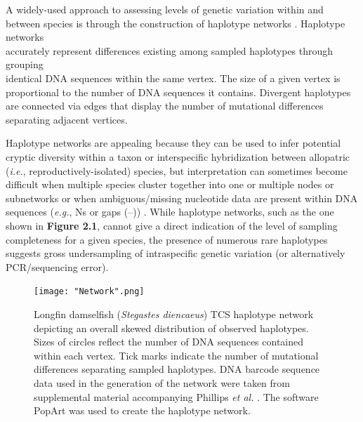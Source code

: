A widely-used approach to assessing levels of genetic variation within and between species is through the construction of haplotype networks \cite{templeton1992cladistic}. Haplotype networks \\ accurately represent differences existing among sampled haplotypes through grouping \\ identical DNA sequences within the same vertex. The size of a given vertex is proportional to the number of DNA sequences it contains.  Divergent haplotypes are connected via edges that display the number of mutational differences separating adjacent vertices.

 

Haplotype networks are appealing because they can be used to infer potential cryptic diversity within a taxon or interspecific hybridization between allopatric \\ (\textit{i.e.}, reproductively-isolated) species, but interpretation can sometimes become difficult when multiple species cluster together into one or multiple nodes or subnetworks \cite{hanner2011dna, hart2007things, wong2009identifying} or when ambiguous/missing nucleotide data are present within DNA sequences (\textit{e.g.}, Ns or gaps (--)) \cite{joly2007haplotype}. While haplotype networks, such as the one shown in \textbf{Figure 2.1}, cannot give a direct indication of the level of sampling completeness for a given species, the presence of numerous rare haplotypes suggests gross undersampling of intraspecific genetic variation (or alternatively PCR/sequencing error).

\begin{figure}[H]

\centering

\texttt{[image: "Network".png]}

\caption[Labelled haplotype network showing a skewed distribution of haplotypes for Longfin damselfish (\textit{Stegastes diencaeus}).]{Longfin damselfish (\textit{Stegastes diencaeus}) TCS \cite{templeton1992cladistic} haplotype network depicting an overall skewed distribution of observed haplotypes. Sizes of circles reflect the number of DNA sequences contained within each vertex. Tick marks indicate the number of mutational differences separating sampled haplotypes. DNA barcode sequence data used in the generation of the network were taken from supplemental material accompanying Phillips \textit{et al.} \cite{phillips2015exploration}. The software PopArt \cite{leigh2015popart} was used to create the haplotype network.}

\end{figure}



